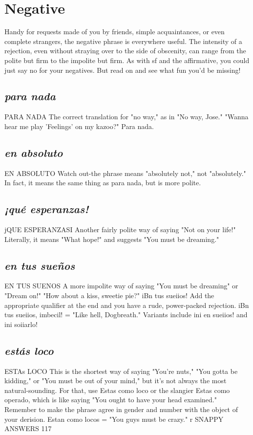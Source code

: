 \section{Negative}
Handy for requests made of you by friends, simple acquaintances, or even complete strangers, the negative phrase is everywhere
useful. The intensity of a rejection, even without straying over to the
side of obscenity, can range from the polite but firm to the impolite
but firm. As with sf and the affirmative, you could just say no for your
negatives. But read on and see what fun you'd be missing!
\subsection{\emph{para nada}}
PARA NADA
The correct translation for "no way," as in "No way, Jose."
"Wanna hear me play 'Feelings' on my kazoo?" Para nada.
\subsection{\emph{en absoluto}}
EN ABSOLUTO
Watch out-the phrase means "absolutely not," not "absolutely." In fact, it means the same thing as para nada, but is
more polite.
\subsection{\emph{¡qué esperanzas!}}
jQUE ESPERANZASI
Another fairly polite way of saying "Not on your life!" Literally, it means "What hope!" and suggests "You must be dreaming."
\subsection{\emph{en tus sueños}}
EN TUS SUENOS
A more impolite way of saying "You must be dreaming" or
"Dream on!" "How about a kiss, sweetie pie?" iBn tus sueiios! Add the
appropriate qualifier at the end and you have a rude, power-packed rejection. iBn tus sueiios, imbecil! = "Like hell, Dogbreath." Variants
include ini en sueiios! and ini soiiarlo!
\subsection{\emph{estás loco}}
ESTAs LOCO
This is the shortest way of saying "You're nuts," "You gotta be
kidding," or "You must be out of your mind," but it's not always the
most natural-sounding. For that, use Estas como loco or the slangier
Estas como operado, which is like saying "You ought to have your
head examined." Remember to make the phrase agree in gender and
number with the object of your derision. Estan como locos = "You
guys must be crazy."
r SNAPPY ANSWERS 117
